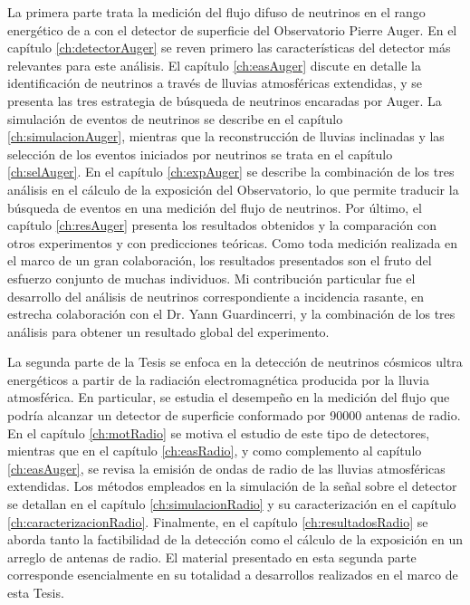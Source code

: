 La primera parte trata la medici\'on del flujo difuso de neutrinos en el rango energ\'etico de  a  con el detector de superficie del Observatorio Pierre Auger. En el cap\'itulo \ref{ch:detectorAuger} se reven primero las caracter\'isticas del detector m\'as relevantes para este análisis.
El cap\'itulo \ref{ch:easAuger} discute en detalle la identificación de neutrinos a través de lluvias atmosf\'ericas extendidas, y se presenta las tres estrategia de búsqueda de neutrinos encaradas por Auger. La simulación de eventos de neutrinos se describe en el cap\'itulo \ref{ch:simulacionAuger}, mientras que la reconstrucci\'on de lluvias inclinadas y las selecci\'on de los eventos iniciados por neutrinos se trata en el cap\'itulo \ref{ch:selAuger}.
En el cap\'itulo \ref{ch:expAuger} se describe la combinación de los tres análisis en el c\'alculo de la exposici\'on del Observatorio, lo que permite traducir la búsqueda de eventos en una medición del flujo de neutrinos. Por último, el capítulo \ref{ch:resAuger} presenta los resultados obtenidos y la comparación con otros experimentos y con predicciones te\'oricas. Como toda medición realizada en el marco de un gran colaboración, los resultados presentados son el fruto del esfuerzo conjunto de muchas individuos. Mi contribución particular fue el desarrollo del análisis de neutrinos correspondiente a incidencia rasante, en estrecha colaboración con el Dr. Yann Guardincerri, y la combinación de los tres análisis para obtener un resultado global del experimento.

La segunda parte de la Tesis se enfoca en la detecci\'on de neutrinos c\'osmicos ultra energ\'eticos a partir de la radiaci\'on electromagn\'etica producida por la lluvia atmosf\'erica. En particular, se estudia el desempe\~no en la medici\'on del flujo que podr\'ia alcanzar un detector de superficie conformado por 90000 antenas de radio.
En el cap\'itulo \ref{ch:motRadio} se motiva el estudio de este tipo de detectores, mientras que en el cap\'itulo \ref{ch:easRadio}, y como complemento al cap\'itulo \ref{ch:easAuger}, se revisa la emisi\'on de ondas de radio de las lluvias atmosf\'ericas extendidas.
Los m\'etodos empleados en la simulaci\'on de la se\~nal sobre el detector se detallan en el cap\'itulo \ref{ch:simulacionRadio} y su caracterizaci\'on en el cap\'itulo \ref{ch:caracterizacionRadio}.
Finalmente, en el cap\'itulo \ref{ch:resultadosRadio} se aborda tanto la factibilidad de la detecci\'on como el c\'alculo de la exposici\'on en un arreglo de antenas de radio. El material presentado en esta segunda parte corresponde esencialmente en su totalidad a desarrollos realizados en el marco de esta Tesis.

